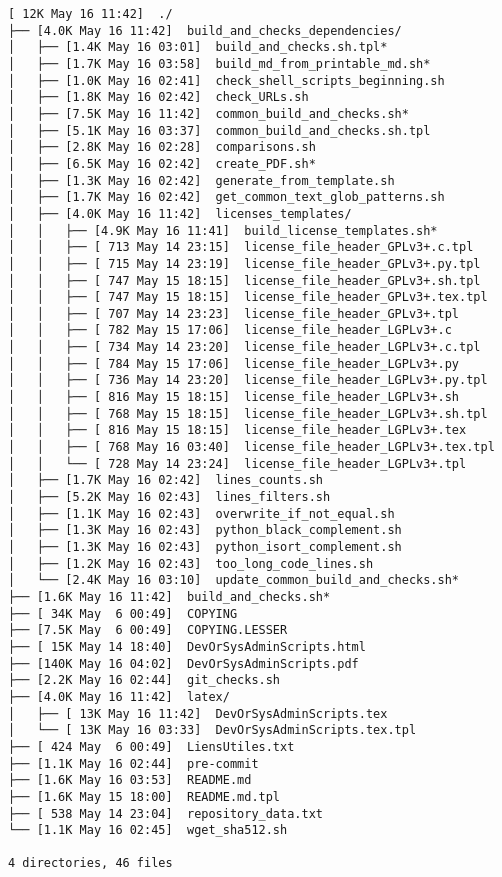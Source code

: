 \documentclass{article}
\begin{document}
\begin{verbatim}
[ 12K May 16 11:42]  ./
├── [4.0K May 16 11:42]  build_and_checks_dependencies/
│   ├── [1.4K May 16 03:01]  build_and_checks.sh.tpl*
│   ├── [1.7K May 16 03:58]  build_md_from_printable_md.sh*
│   ├── [1.0K May 16 02:41]  check_shell_scripts_beginning.sh
│   ├── [1.8K May 16 02:42]  check_URLs.sh
│   ├── [7.5K May 16 11:42]  common_build_and_checks.sh*
│   ├── [5.1K May 16 03:37]  common_build_and_checks.sh.tpl
│   ├── [2.8K May 16 02:28]  comparisons.sh
│   ├── [6.5K May 16 02:42]  create_PDF.sh*
│   ├── [1.3K May 16 02:42]  generate_from_template.sh
│   ├── [1.7K May 16 02:42]  get_common_text_glob_patterns.sh
│   ├── [4.0K May 16 11:42]  licenses_templates/
│   │   ├── [4.9K May 16 11:41]  build_license_templates.sh*
│   │   ├── [ 713 May 14 23:15]  license_file_header_GPLv3+.c.tpl
│   │   ├── [ 715 May 14 23:19]  license_file_header_GPLv3+.py.tpl
│   │   ├── [ 747 May 15 18:15]  license_file_header_GPLv3+.sh.tpl
│   │   ├── [ 747 May 15 18:15]  license_file_header_GPLv3+.tex.tpl
│   │   ├── [ 707 May 14 23:23]  license_file_header_GPLv3+.tpl
│   │   ├── [ 782 May 15 17:06]  license_file_header_LGPLv3+.c
│   │   ├── [ 734 May 14 23:20]  license_file_header_LGPLv3+.c.tpl
│   │   ├── [ 784 May 15 17:06]  license_file_header_LGPLv3+.py
│   │   ├── [ 736 May 14 23:20]  license_file_header_LGPLv3+.py.tpl
│   │   ├── [ 816 May 15 18:15]  license_file_header_LGPLv3+.sh
│   │   ├── [ 768 May 15 18:15]  license_file_header_LGPLv3+.sh.tpl
│   │   ├── [ 816 May 15 18:15]  license_file_header_LGPLv3+.tex
│   │   ├── [ 768 May 16 03:40]  license_file_header_LGPLv3+.tex.tpl
│   │   └── [ 728 May 14 23:24]  license_file_header_LGPLv3+.tpl
│   ├── [1.7K May 16 02:42]  lines_counts.sh
│   ├── [5.2K May 16 02:43]  lines_filters.sh
│   ├── [1.1K May 16 02:43]  overwrite_if_not_equal.sh
│   ├── [1.3K May 16 02:43]  python_black_complement.sh
│   ├── [1.3K May 16 02:43]  python_isort_complement.sh
│   ├── [1.2K May 16 02:43]  too_long_code_lines.sh
│   └── [2.4K May 16 03:10]  update_common_build_and_checks.sh*
├── [1.6K May 16 11:42]  build_and_checks.sh*
├── [ 34K May  6 00:49]  COPYING
├── [7.5K May  6 00:49]  COPYING.LESSER
├── [ 15K May 14 18:40]  DevOrSysAdminScripts.html
├── [140K May 16 04:02]  DevOrSysAdminScripts.pdf
├── [2.2K May 16 02:44]  git_checks.sh
├── [4.0K May 16 11:42]  latex/
│   ├── [ 13K May 16 11:42]  DevOrSysAdminScripts.tex
│   └── [ 13K May 16 03:33]  DevOrSysAdminScripts.tex.tpl
├── [ 424 May  6 00:49]  LiensUtiles.txt
├── [1.1K May 16 02:44]  pre-commit
├── [1.6K May 16 03:53]  README.md
├── [1.6K May 15 18:00]  README.md.tpl
├── [ 538 May 14 23:04]  repository_data.txt
└── [1.1K May 16 02:45]  wget_sha512.sh

4 directories, 46 files
\end{verbatim}
\end{document}
